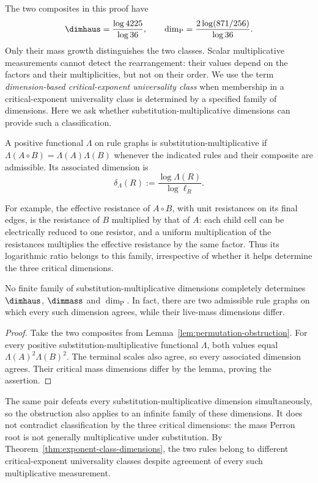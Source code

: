 The two composites in this proof have
\[
 \dimhaus=\frac{\log4225}{\log36},\qquad
 \dim_{\mathrm P}=\frac{2\log(871/256)}{\log36}.
\]
Only their mass growth distinguishes the two classes.
Scalar multiplicative measurements cannot detect the rearrangement: their values depend on the factors and their multiplicities, but not on their order.
We use the term \emph{dimension-based critical-exponent universality class} when membership in a critical-exponent universality class is determined by a specified family of dimensions.
Here we ask whether substitution-multiplicative dimensions can provide such a classification.

\begin{definition}\label{def:multiplicative-dimension}
A positive functional $\Lambda$ on rule graphs is substitution-multiplicative if $\Lambda(A\circ B)=\Lambda(A)\Lambda(B)$ whenever the indicated rules and their composite are admissible. Its associated dimension is
\[
 \delta_\Lambda(R):=\frac{\log\Lambda(R)}{\log\ell_R}.
\]
\end{definition}
For example, the effective resistance of $A\circ B$, with unit resistances on its final edges, is the resistance of $B$ multiplied by that of $A$: each child cell can be electrically reduced to one resistor, and a uniform multiplication of the resistances multiplies the effective resistance by the same factor. Thus its logarithmic ratio belongs to this family, irrespective of whether it helps determine the three critical dimensions.

\begin{theorem}\label{thm:no-multiplicative-classification}
No finite family of substitution-multiplicative dimensions completely determines $\dimhaus$, $\dimmass$ and $\dim_{\mathrm P}$. In fact, there are two admissible rule graphs on which every such dimension agrees, while their live-mass dimensions differ.
\end{theorem}

\begin{proof}
Take the two composites from Lemma~\ref{lem:permutation-obstruction}.
For every positive substitution-multiplicative functional $\Lambda$, both values equal $\Lambda(A)^2\Lambda(B)^2$.
The terminal scales also agree, so every associated dimension agrees.
Their critical mass dimensions differ by the lemma, proving the assertion.
\end{proof}

The same pair defeats every substitution-multiplicative dimension simultaneously, so the obstruction also applies to an infinite family of these dimensions.
It does not contradict classification by the three critical dimensions: the mass Perron root is not generally multiplicative under substitution.
By Theorem~\ref{thm:exponent-class-dimensions}, the two rules belong to different critical-exponent universality classes despite agreement of every such multiplicative measurement.

